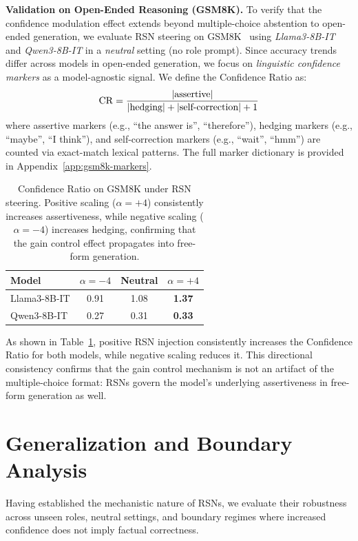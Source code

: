 \documentclass{article}
\begin{document}
\textbf{Validation on Open-Ended Reasoning (GSM8K).}
To verify that the confidence modulation effect extends beyond multiple-choice abstention to open-ended generation, we evaluate RSN steering on GSM8K~\cite{gsm8k} using \emph{Llama3-8B-IT} and \emph{Qwen3-8B-IT} in a \emph{neutral} setting (no role prompt). Since accuracy trends differ across models in open-ended generation, we focus on \emph{linguistic confidence markers} as a model-agnostic signal. We define the Confidence Ratio as:
\[
\mathrm{CR} = \frac{|\text{assertive}|}{|\text{hedging}| + |\text{self\text{-}correction}| + 1}
\]
where assertive markers (e.g., ``the answer is'', ``therefore''), hedging markers (e.g., ``maybe'', ``I think''), and self-correction markers (e.g., ``wait'', ``hmm'') are counted via exact-match lexical patterns. The full marker dictionary is provided in Appendix~\ref{app:gsm8k-markers}.

\begin{table}[htbp]
\centering
\small
\caption{Confidence Ratio on GSM8K under RSN steering. Positive scaling ($\alpha{=}+4$) consistently increases assertiveness, while negative scaling ($\alpha{=}-4$) increases hedging, confirming that the gain control effect propagates into free-form generation.}
\label{tab:gsm8k-confidence}
\setlength{\tabcolsep}{8pt}
\renewcommand{\arraystretch}{1.1}
\begin{tabular}{l ccc}
\toprule
\textbf{Model} & $\alpha = -4$ & \textbf{Neutral} & $\alpha = +4$ \\
\midrule
Llama3-8B-IT & 0.91 & 1.08 & \textbf{1.37} \\
Qwen3-8B-IT  & 0.27 & 0.31 & \textbf{0.33} \\
\bottomrule
\end{tabular}
\end{table}

As shown in Table~\ref{tab:gsm8k-confidence}, positive RSN injection consistently increases the Confidence Ratio for both models, while negative scaling reduces it. This directional consistency confirms that the gain control mechanism is not an artifact of the multiple-choice format: RSNs govern the model's underlying assertiveness in free-form generation as well.

\section{Generalization and Boundary Analysis}
\label{sec:generalization}
Having established the mechanistic nature of RSNs, we evaluate their robustness across unseen roles, neutral settings, and boundary regimes where increased confidence does not imply factual correctness.
\end{document}

